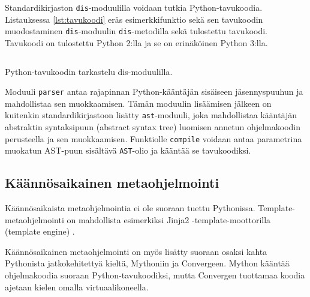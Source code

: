 \documentclass[finnish]{tktltiki2}
\theoremstyle{definition}
\theoremstyle{remark}
\begin{document}
Standardikirjaston \verb|dis|-moduulilla voidaan tutkia Python-tavukoodia. Listauksessa \ref{lst:tavukoodi} eräs esimerkkifunktio sekä sen tavukoodin muodostaminen \verb|dis|-moduulin \verb|dis|-metodilla sekä tulostettu tavukoodi. Tavukoodi on tulostettu Python 2:lla ja se on erinäköinen Python 3:lla.

\begin{listing}
    \inputminted[linenos]{python}{code/tavukoodi.py}
    \caption{Python-tavukoodin tarkastelu dis-moduulilla.}
    \label{lst:tavukoodi}
\end{listing}

Moduuli \verb|parser| antaa rajapinnan Python-kääntäjän sisäiseen jäsennyspuuhun ja mahdollistaa sen muokkaamisen. Tämän moduulin lisäämisen jälkeen on kuitenkin standardikirjastoon lisätty \verb|ast|-moduuli, joka mahdollistaa kääntäjän abstraktin syntaksipuun (abstract syntax tree) luomisen annetun ohjelmakoodin perusteella ja sen muokkaamisen. Funktiolle \verb|compile| voidaan antaa parametrina muokatun AST-puun sisältävä \verb|AST|-olio ja kääntää se tavukoodiksi.

\subsection{Käännösaikainen metaohjelmointi}

Käännösaikaista metaohjelmointia ei ole suoraan tuettu Pythonissa. Template-metaohjelmointi on mahdollista esimerkiksi Jinja2 -template-moottorilla (template engine) \cite{jinja}.

Käännösaikainen metaohjelmointi on myös lisätty suoraan osaksi kahta Pythonista jatkokehitettyä kieltä, Mythoniin\cite{mython} ja Convergeen\cite{tratt05}. Mython kääntää ohjelmakoodia suoraan Python-tavukoodiksi, mutta Convergen tuottamaa koodia ajetaan kielen omalla virtuaalikoneella.





\pagebreak

%
%
% 
%




\lastpage
\end{document}
